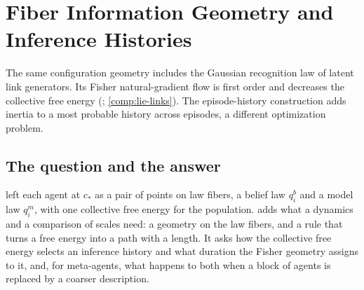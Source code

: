\chapter{Fiber Information Geometry and Inference Histories}
\label{comp:ch07}

The same configuration geometry includes the Gaussian recognition law of latent link generators.
Its Fisher natural-gradient flow is first order and decreases the collective free energy
(; \cref{comp:lie-links}). The episode-history construction adds
inertia to a most probable history across episodes, a different optimization problem.

\section{The question and the answer}
\label{comp:ch07-question}

 left each agent at $c_*$ as a pair of points on law fibers, a belief law $q_i^b$
and a model law $q_i^m$, with one collective free energy for the population. 
adds what a dynamics and a comparison of scales need: a geometry on the law fibers, and a rule that
turns a free energy into a path with a length. It asks how the collective free energy selects an
inference history and what duration the Fisher geometry assigns to it, and, for meta-agents, what
happens to both when a block of agents is replaced by a coarser description.

